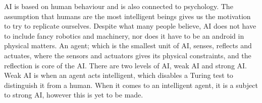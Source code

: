 AI is based on human behaviour and is also connected to psychology.
The assumption that humans are the most intelligent beings gives us the motivation to try to replicate ourselves.
Despite what many people believe, AI does not have to include fancy robotics and machinery, nor does it have to be an android in physical matters.
An agent; which is the smallest unit of AI, senses, reflects and actuates, where the sensors and actuators gives its physical constraints, and the reflection is core of the AI.
There are two levels of AI, weak AI and strong AI. Weak AI is when an agent acts intelligent, which disables a Turing test to distinguish it from a human.
When it comes to an intelligent agent, it is a subject to strong AI, however this is yet to be made.